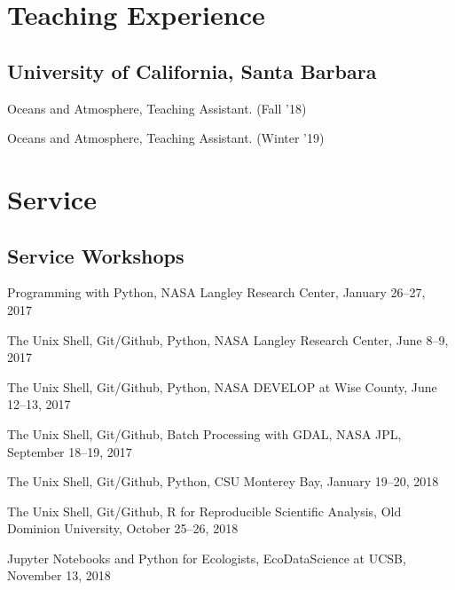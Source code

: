 \documentclass[12pt,letterpaper]{report}
\newcommand{\listitemspace}{0.15em}
\renewenvironment{itemize}
{\begin{list}{}{\setlength{\leftmargin}{0em}
			\setlength{\parskip}{0em}
			\setlength{\itemsep}{\listitemspace}
			\setlength{\parsep}{\listitemspace}}}
	{\end{list}}
\begin{document}
	\section*{Teaching Experience}
	
	\subsection*{University of California, Santa Barbara}
	
	\begin{itemize}
		
		\item Oceans and Atmosphere, Teaching Assistant. (Fall '18)
		
		\item Oceans and Atmosphere, Teaching Assistant. (Winter '19)
		
	\end{itemize}
	
	
	
	\section*{Service}
	
	\subsection*{Service Workshops}
	
	\begin{itemize}
		
		\item Programming with Python, NASA Langley Research Center, January 26--27, 2017 
		
		\item The Unix Shell, Git/Github, Python, NASA Langley Research Center, June 8--9, 2017
		
                \item The Unix Shell, Git/Github, Python, NASA DEVELOP at Wise County, June 12--13, 2017

                \item The Unix Shell, Git/Github, Batch Processing with GDAL, NASA JPL, September 18--19, 2017

                \item The Unix Shell, Git/Github, Python, CSU Monterey Bay, January 19--20, 2018

                \item The Unix Shell, Git/Github, R for Reproducible Scientific Analysis, Old Dominion University, October 25--26, 2018

                \item Jupyter Notebooks and Python for Ecologists, EcoDataScience at UCSB, November 13, 2018
		
	\end{itemize}
	
\end{document}
